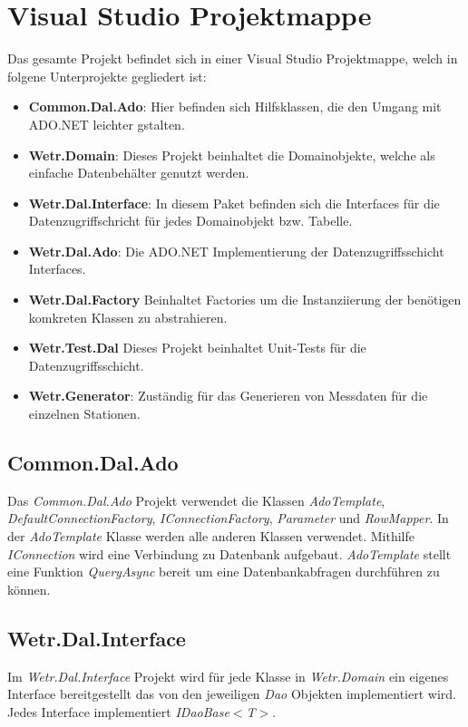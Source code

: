 \section{Visual Studio Projektmappe}

Das gesamte Projekt befindet sich in einer Visual Studio Projektmappe, welch in folgene Unterprojekte gegliedert ist:
\begin{itemize}
    \item \textbf{Common.Dal.Ado}: Hier befinden sich Hilfsklassen, die den Umgang mit ADO.NET leichter gstalten.
    \item \textbf{Wetr.Domain}: Dieses Projekt beinhaltet die Domainobjekte, welche als einfache Datenbehälter genutzt werden.
    \item \textbf{Wetr.Dal.Interface}: In diesem Paket befinden sich die Interfaces für die Datenzugriffschricht für jedes Domainobjekt bzw. Tabelle.
    \item \textbf{Wetr.Dal.Ado}: Die ADO.NET Implementierung der Datenzugriffsschicht Interfaces.
    \item \textbf{Wetr.Dal.Factory} Beinhaltet Factories um die Instanziierung der benötigen komkreten Klassen zu abstrahieren.
    \item \textbf{Wetr.Test.Dal} Dieses Projekt beinhaltet Unit-Tests für die Datenzugriffsschicht.
    \item \textbf{Wetr.Generator}: Zuständig für das Generieren von Messdaten für die einzelnen Stationen.
\end{itemize}

\subsection{Common.Dal.Ado}
Das \textit{Common.Dal.Ado} Projekt verwendet die Klassen \textit{AdoTemplate}, \textit{DefaultConnectionFactory}, \textit{IConnectionFactory}, \textit{Parameter} und  \textit{RowMapper}. In der  \textit{AdoTemplate} Klasse werden alle anderen Klassen verwendet. Mithilfe  \textit{IConnection} wird eine Verbindung zu Datenbank aufgebaut.  \textit{AdoTemplate} stellt eine Funktion  \textit{QueryAsync} bereit um eine Datenbankabfragen durchführen zu können.

\subsection{Wetr.Dal.Interface}
Im \textit{Wetr.Dal.Interface} Projekt wird für jede Klasse in  \textit{Wetr.Domain} ein eigenes Interface bereitgestellt das von den jeweiligen \textit{Dao} Objekten implementiert wird. Jedes Interface implementiert \textit{IDaoBase}$<$\textit{T}$>$.


